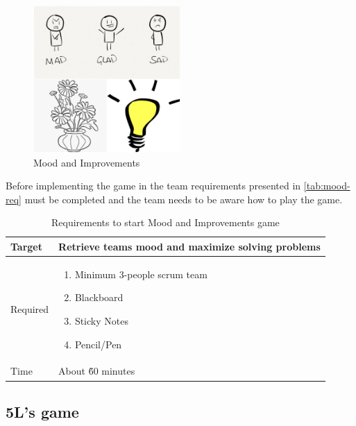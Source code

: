 \begin{figure}[h]
\caption{Mood and Improvements} 
\label{fig:moodPic}
\centering
\includegraphics[width=0.5\textwidth]{img/mood}
\end{figure}

Before implementing the game in the team requirements presented in \autoref{tab:mood-req} must be completed and the team needs to be aware how to play the game.

\begin{table}[h]
	\caption{Requirements to start Mood and Improvements game}
	\label{tab:mood-req}
	\begin{tabularx}{\textwidth}{|X|X|}
	\hline
		Target & Retrieve teams mood and maximize solving problems  \\ \hline
		Required			& \begin{enumerate}
		    \item Minimum 3-people scrum team
		    \item Blackboard
		    \item Sticky Notes
		    \item Pencil/Pen
		\end{enumerate}	 \\ \hline
		Time & About \~60 minutes\\ \hline
	\end{tabularx}
\end{table}


\subsection{5L's game}
\label{subch:5LGame}


